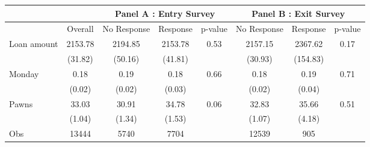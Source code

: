 \begin{tabular}{lcccc|ccc}
\toprule
      &       & \multicolumn{3}{c|}{Panel A : Entry Survey} & \multicolumn{3}{c}{Panel B : Exit Survey} \\
\midrule
\midrule
      & Overall & No Response & Response & p-value & No Response & Response & p-value \\
\midrule
\midrule
Loan amount  & 2153.78 & 2194.85 & 2153.78 & 0.53  & 2157.15 & 2367.62 & 0.17 \\
      & (31.82) & (50.16) & (41.81) &       & (30.93) & (154.83) &  \\
Monday & 0.18  & 0.19  & 0.18  & 0.66  & 0.18  & 0.19  & 0.71 \\
      & (0.02) & (0.02) & (0.03) &       & (0.02) & (0.04) &  \\
Pawns & 33.03 & 30.91 & 34.78 & 0.06  & 32.83 & 35.66 & 0.51 \\
      & (1.04) & (1.34) & (1.53) &       & (1.07) & (4.18) &  \\
\midrule
Obs   & 13444 & 5740  & 7704  &       & 12539 & 905   &  \\
\bottomrule
\bottomrule
\end{tabular}%
